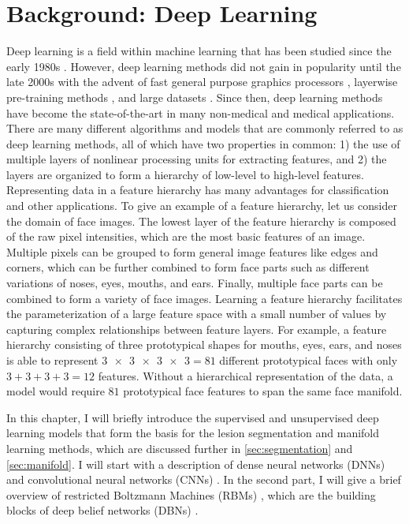 \chapter{Background: Deep Learning}
\label{sec:background}

Deep learning is a field within machine learning that has been studied since the
early 1980s \citep{fukushima1980}. However, deep learning methods did not gain
in popularity until the late 2000s with the advent of fast general purpose
graphics processors \citep{raina2009}, layerwise pre-training methods
\citep{hinton2006b,hinton2006c}, and large datasets
\citep{deng2009,krizhevsky2012}. Since then, deep learning methods have become
the state-of-the-art in many non-medical \citep{krizhevsky2012,sainath2013} and
medical \citep{ciresan2012,kamnitsas2015} applications. There are many different
algorithms and models that are commonly referred to as deep learning methods,
all of which have two properties in common: 1) the use of multiple layers of
nonlinear processing units for extracting features, and 2) the layers are
organized to form a hierarchy of low-level to high-level features. Representing
data in a feature hierarchy has many advantages for classification and other
applications. To give an example of a feature hierarchy, let us consider the
domain of face images. The lowest layer of the feature hierarchy is composed of
the raw pixel intensities, which are the most basic features of an image.
Multiple pixels can be grouped to form general image features like edges and
corners, which can be further combined to form face parts such as different
variations of noses, eyes, mouths, and ears.
Finally, multiple face parts can be combined to form a variety of face images.
Learning a feature hierarchy facilitates the parameterization of a large feature
space with a small number of values by capturing complex relationships between
feature layers. For example, a feature hierarchy consisting of three
prototypical shapes for mouths, eyes, ears, and noses is able to represent
$\num{3x3x3x3} = 81$ different prototypical faces with only $3+3+3+3=12$
features. Without a hierarchical representation of the data, a model would
require $81$ prototypical face features to span the same face manifold.

In this chapter, I will briefly introduce the supervised and unsupervised deep
learning models that form the basis for the lesion segmentation and manifold
learning methods, which are discussed further in \ref{sec:segmentation}
and \ref{sec:manifold}. I will start with a description of dense neural
networks (DNNs) \citep{farley1954,werbos1974,rumelhart1986} and convolutional
neural networks (CNNs) \citep{fukushima1980,lecun1989,lecun1998}. In the second
part, I will give a brief overview of restricted Boltzmann Machines (RBMs)
\citep{freund1992,hinton2010a}, which are the building blocks of deep belief
networks (DBNs) \citep{hinton2006b}.

